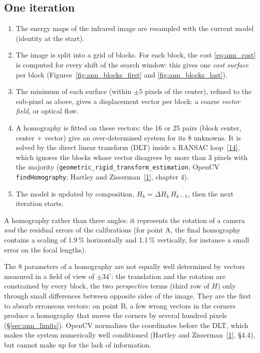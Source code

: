 \documentclass[a4paper,11pt]{report}
\begin{document}
\subsection{One iteration}
\begin{enumerate}
	\item The energy maps of the infrared image are resampled with the current model (identity at the start).
	\item The image is split into a grid of blocks. For each block, the cost \eqref{eq:ann_cost} is computed for every shift of the search window: this gives one \emph{cost surface} per block (Figures~\ref{fig:ann_blocks_first} and \ref{fig:ann_blocks_last}).
	\item The minimum of each surface (within $\pm 5$ pixels of the center), refined to the sub-pixel as above, gives a displacement vector per block: a coarse \emph{vector field}, or optical flow.
	\item A homography is fitted on these vectors: the 16 or 25 pairs (block center, center + vector) give an over-determined system for its 8 unknowns. It is solved by the direct linear transform (DLT) inside a RANSAC loop~[\hyperref[ann_ransac]{14}], which ignores the blocks whose vector disagrees by more than 3 pixels with the majority (\texttt{geometric\_rigid\_transform\_estimation}, OpenCV \texttt{findHomography}; Hartley and Zisserman~[\hyperref[ann_hz]{1}], chapter 4).
	\item The model is updated by composition, $H_k = \Delta H_k\, H_{k-1}$, then the next iteration starts.
\end{enumerate}
A homography rather than three angles: it represents the rotation of a camera \emph{and} the residual errors of the calibrations (for point A, the final homography contains a scaling of 1.9\,\% horizontally and 1.1\,\% vertically, for instance a small error on the focal lengths).

The 8 parameters of a homography are not equally well determined by vectors measured in a field of view of $\pm 34^\circ$: the translation and the rotation are constrained by every block, the two \emph{perspective} terms (third row of $H$) only through small differences between opposite sides of the image. They are the first to absorb erroneous vectors: on point B, a few wrong vectors in the corners produce a homography that moves the corners by several hundred pixels (\S\ref{sec:ann_limits}). OpenCV normalizes the coordinates before the DLT, which makes the system numerically well conditioned (Hartley and Zisserman~[\hyperref[ann_hz]{1}], \S4.4), but cannot make up for the lack of information.
\end{document}
